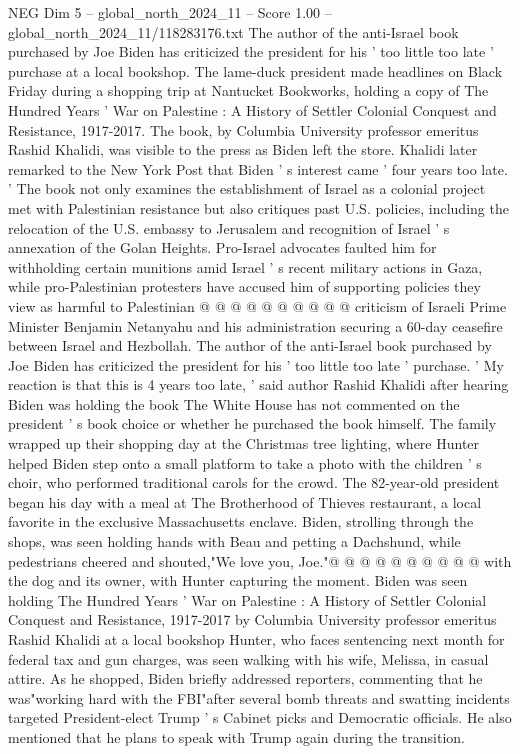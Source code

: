 \begin{textsample}{NEG Dim 5 – global\_north\_2024\_11 – Score 1.00 – global\_north\_2024\_11/118283176.txt}  \label{ex:f5_neg_415}
The author of the anti-Israel book purchased by Joe Biden has criticized the president for his ' too little too late ' purchase at a local bookshop.
The lame-duck president made headlines on Black Friday during a shopping trip at Nantucket Bookworks, holding a copy of The Hundred Years ' War on Palestine : A History of Settler Colonial Conquest and Resistance, 1917-2017.
The book, by Columbia University professor emeritus Rashid Khalidi, was visible to the press as Biden left the store.
Khalidi later remarked to the New York Post that Biden ' s interest came ' four years too late. ' The book not only examines the establishment of Israel as a colonial project met with Palestinian resistance but also critiques past U.S. policies, including the relocation of the U.S. embassy to Jerusalem and recognition of Israel ' s annexation of the Golan Heights.
Pro-Israel advocates faulted him for withholding certain munitions amid Israel ' s recent military actions in Gaza, while pro-Palestinian protesters have accused him of supporting policies they view as harmful to Palestinian @ @ @ @ @ @ @ @ @ @ criticism of Israeli Prime Minister Benjamin Netanyahu and his administration securing a 60-day ceasefire between Israel and Hezbollah.
The author of the anti-Israel book purchased by Joe Biden has criticized the president for his ' too little too late ' purchase. ' My reaction is that this is 4 years too late, ' said author Rashid Khalidi after hearing Biden was holding the book The White House has not commented on the president ' s book choice or whether he purchased the book himself.
The family wrapped up their shopping day at the Christmas tree lighting, where Hunter helped Biden step onto a small platform to take a photo with the children ' s choir, who performed traditional carols for the crowd.
The 82-year-old president began his day with a meal at The Brotherhood of Thieves restaurant, a local favorite in the exclusive Massachusetts enclave.
Biden, strolling through the shops, was seen holding hands with Beau and petting a Dachshund, while pedestrians cheered and shouted,"We love you, Joe."@ @ @ @ @ @ @ @ @ @ with the dog and its owner, with Hunter capturing the moment.
Biden was seen holding The Hundred Years ' War on Palestine : A History of Settler Colonial Conquest and Resistance, 1917-2017 by Columbia University professor emeritus Rashid Khalidi at a local bookshop Hunter, who faces sentencing next month for federal tax and gun charges, was seen walking with his wife, Melissa, in casual attire.
As he shopped, Biden briefly addressed reporters, commenting that he was"working hard with the FBI"after several bomb threats and swatting incidents targeted President-elect Trump ' s Cabinet picks and Democratic officials.
He also mentioned that he plans to speak with Trump again during the transition.

\end{textsample}
